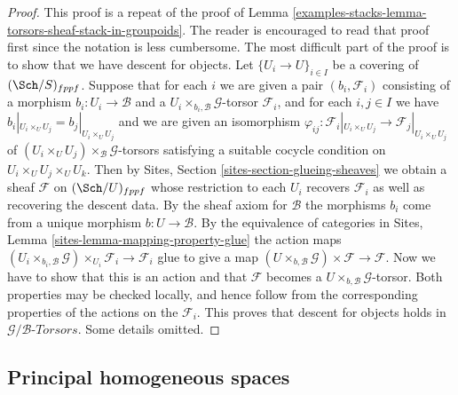 \begin{proof}
This proof is a repeat of the proof of
Lemma \ref{examples-stacks-lemma-torsors-sheaf-stack-in-groupoids}.
The reader is encouraged to read that proof first since
the notation is less cumbersome.
The most difficult part of the proof is to show that
we have descent for objects. Let $\{U_i \to U\}_{i \in I}$
be a covering of $(\Sch/S)_{fppf}$.
Suppose that for each $i$ we are given a pair $(b_i, \mathcal{F}_i)$
consisting of a morphism $b_i : U_i \to \mathcal{B}$ and a
$U_i \times_{b_i, \mathcal{B}} \mathcal{G}$-torsor
$\mathcal{F}_i$, and for each $i, j \in I$
we have $b_i|_{U_i \times_U U_j} = b_j|_{U_i \times_U U_j}$ and
we are given an isomorphism
$\varphi_{ij} :
\mathcal{F}_i|_{U_i \times_U U_j} \to \mathcal{F}_j|_{U_i \times_U U_j}$
of $(U_i \times_U U_j) \times_\mathcal{B} \mathcal{G}$-torsors
satisfying a suitable cocycle condition on $U_i \times_U U_j \times_U U_k$.
Then by
Sites, Section \ref{sites-section-glueing-sheaves}
we obtain a sheaf $\mathcal{F}$ on $(\Sch/U)_{fppf}$
whose restriction to each $U_i$ recovers $\mathcal{F}_i$ as well
as recovering the descent data. By the sheaf axiom for $\mathcal{B}$
the morphisms $b_i$ come from a unique morphism $b : U \to \mathcal{B}$.
By the equivalence of categories in
Sites, Lemma \ref{sites-lemma-mapping-property-glue}
the action maps
$(U_i \times_{b_i, \mathcal{B}} \mathcal{G}) \times_{U_i} \mathcal{F}_i
\to \mathcal{F}_i$
glue to give a map
$(U \times_{b, \mathcal{B}} \mathcal{G}) \times \mathcal{F} \to \mathcal{F}$.
Now we have to show that this is an action and that $\mathcal{F}$ becomes
a $U \times_{b, \mathcal{B}} \mathcal{G}$-torsor.
Both properties may be checked locally, and
hence follow from the corresponding properties of the actions
on the $\mathcal{F}_i$.
This proves that descent for objects holds in
$\mathcal{G}/\mathcal{B}\textit{-Torsors}$.
Some details omitted.
\end{proof}


\subsection{Principal homogeneous spaces}
\label{examples-stacks-subsection-principal-homogeneous-spaces}

